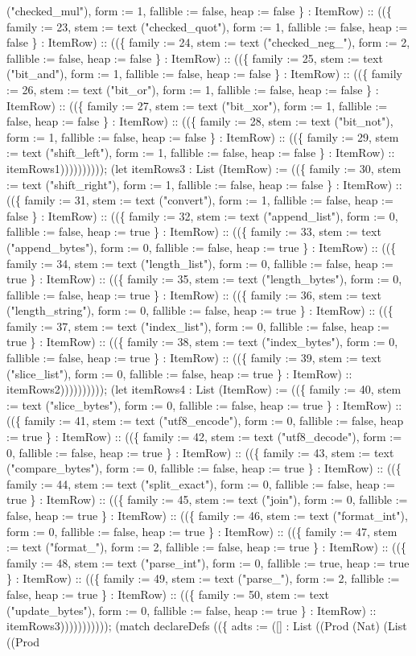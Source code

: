 \documentclass[11pt]{article}
\begin{document}
("checked\_mul"), form := 1, fallible := false, heap := false \} : ItemRow) :: ((\{ family := 23, stem := text ("checked\_quot"), form := 1, fallible := false, heap := false \} : ItemRow) :: ((\{ family := 24, stem := text ("checked\_neg\_"), form := 2, fallible := false, heap := false \} : ItemRow) :: ((\{ family := 25, stem := text ("bit\_and"), form := 1, fallible := false, heap := false \} : ItemRow) :: ((\{ family := 26, stem := text ("bit\_or"), form := 1, fallible := false, heap := false \} : ItemRow) :: ((\{ family := 27, stem := text ("bit\_xor"), form := 1, fallible := false, heap := false \} : ItemRow) :: ((\{ family := 28, stem := text ("bit\_not"), form := 1, fallible := false, heap := false \} : ItemRow) :: ((\{ family := 29, stem := text ("shift\_left"), form := 1, fallible := false, heap := false \} : ItemRow) :: itemRows1)))))))))); (let itemRows3 : List (ItemRow) := ((\{ family := 30, stem := text ("shift\_right"), form := 1, fallible := false, heap := false \} : ItemRow) :: ((\{ family := 31, stem := text ("convert"), form := 1, fallible := false, heap := false \} : ItemRow) :: ((\{ family := 32, stem := text ("append\_list"), form := 0, fallible := false, heap := true \} : ItemRow) :: ((\{ family := 33, stem := text ("append\_bytes"), form := 0, fallible := false, heap := true \} : ItemRow) :: ((\{ family := 34, stem := text ("length\_list"), form := 0, fallible := false, heap := true \} : ItemRow) :: ((\{ family := 35, stem := text ("length\_bytes"), form := 0, fallible := false, heap := true \} : ItemRow) :: ((\{ family := 36, stem := text ("length\_string"), form := 0, fallible := false, heap := true \} : ItemRow) :: ((\{ family := 37, stem := text ("index\_list"), form := 0, fallible := false, heap := true \} : ItemRow) :: ((\{ family := 38, stem := text ("index\_bytes"), form := 0, fallible := false, heap := true \} : ItemRow) :: ((\{ family := 39, stem := text ("slice\_list"), form := 0, fallible := false, heap := true \} : ItemRow) :: itemRows2)))))))))); (let itemRows4 : List (ItemRow) := ((\{ family := 40, stem := text ("slice\_bytes"), form := 0, fallible := false, heap := true \} : ItemRow) :: ((\{ family := 41, stem := text ("utf8\_encode"), form := 0, fallible := false, heap := true \} : ItemRow) :: ((\{ family := 42, stem := text ("utf8\_decode"), form := 0, fallible := false, heap := true \} : ItemRow) :: ((\{ family := 43, stem := text ("compare\_bytes"), form := 0, fallible := false, heap := true \} : ItemRow) :: ((\{ family := 44, stem := text ("split\_exact"), form := 0, fallible := false, heap := true \} : ItemRow) :: ((\{ family := 45, stem := text ("join"), form := 0, fallible := false, heap := true \} : ItemRow) :: ((\{ family := 46, stem := text ("format\_int"), form := 0, fallible := false, heap := true \} : ItemRow) :: ((\{ family := 47, stem := text ("format\_"), form := 2, fallible := false, heap := true \} : ItemRow) :: ((\{ family := 48, stem := text ("parse\_int"), form := 0, fallible := true, heap := true \} : ItemRow) :: ((\{ family := 49, stem := text ("parse\_"), form := 2, fallible := false, heap := true \} : ItemRow) :: ((\{ family := 50, stem := text ("update\_bytes"), form := 0, fallible := false, heap := true \} : ItemRow) :: itemRows3))))))))))); (match declareDefs ((\{ adts := ([] : List ((Prod (Nat) (List ((Prod 
\end{document}
